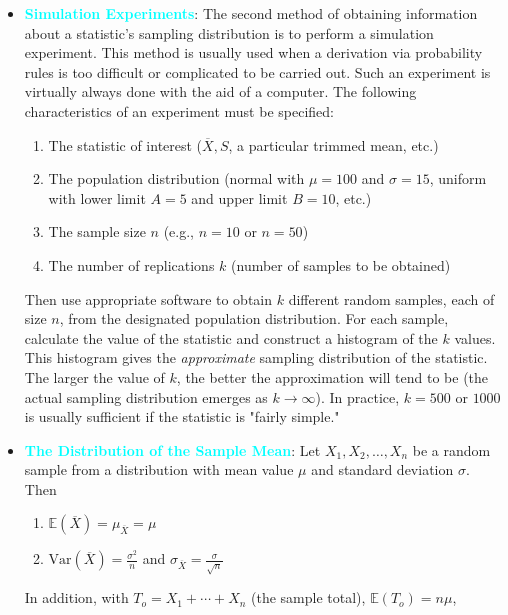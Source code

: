 \documentclass{report}
\begin{document}
\begin{itemize}
        \item \textbf{\textcolor{cyan}{Simulation Experiments}}:
            The second method of obtaining information about a statistic’s sampling distribution
            is to perform a simulation experiment. This method is usually used when a derivation via probability rules is too difficult or complicated to be carried out. Such an
            experiment is virtually always done with the aid of a computer. The following characteristics of an experiment must be specified:
            \bigbreak \noindent 
            \begin{enumerate}
                \item The statistic of interest (\(\overline{X}, S\), a particular trimmed mean, etc.)
                \item The population distribution (normal with \(\mu = 100\) and \(\sigma = 15\), uniform with lower limit \(A = 5\) and upper limit \(B = 10\), etc.)
                \item The sample size \(n\) (e.g., \(n = 10\) or \(n = 50\))
                \item The number of replications \(k\) (number of samples to be obtained)
            \end{enumerate}
            \bigbreak \noindent Then use appropriate software to obtain \( k \) different random samples, each of size \( n \), from the designated population distribution. For each sample, calculate the value of the statistic and construct a histogram of the \( k \) values. This histogram gives the \textit{approximate} sampling distribution of the statistic. The larger the value of \( k \), the better the approximation will tend to be (the actual sampling distribution emerges as \( k \to \infty \)). In practice, \( k = 500 \) or \( 1000 \) is usually sufficient if the statistic is "fairly simple."
        \item \textbf{\textcolor{cyan}{The Distribution of the Sample Mean}}:
            Let \(X_1, X_2, \ldots, X_n\) be a random sample from a distribution with mean value \(\mu\) and standard deviation \(\sigma\). Then
            \begin{enumerate}
                \item \(\mathbb{E}(\overline{X}) = \mu_{\overline{X}} = \mu\)
                \item \(\text{Var}(\overline{X}) = \frac{\sigma^2}{n}\) and \(\sigma_{\overline{X}} = \frac{\sigma}{\sqrt{n}}\)
            \end{enumerate}
            In addition, with \(T_o = X_1 + \cdots + X_n\) (the sample total), \(\mathbb{E}(T_o) = n\mu\),

\end{itemize}
\end{document}
